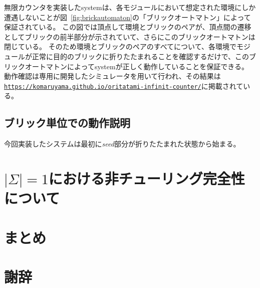 \documentclass[a4j,11pt]{article}
\begin{document}
無限カウンタを実装したsystemは、各モジュールにおいて想定された環境にしか遭遇しないことが図~\ref{fig:brickautomaton}の「ブリックオートマトン」によって保証されている。
この図では頂点して環境とブリックのペアが、頂点間の遷移としてブリックの前半部分が示されていて、さらにこのブリックオートマトンは閉じている。
そのため環境とブリックのペアのすべてについて、各環境でモジュールが正常に目的のブリックに折りたたまれることを確認するだけで、このブリックオートマトンによってsystemが正しく動作していることを保証できる。
動作確認は専用に開発したシミュレータを用いて行われ、その結果は\href{https://komaruyama.github.io/oritatami-infinit-counter/}{\texttt{https://komaruyama.github.io/oritatami-infinit-counter/}}に掲載されている。


\subsection{ブリック単位での動作説明}
今回実装したシステムは最初に\textit{seed}部分が折りたたまれた状態から始まる。


\section{$| \Sigma | = 1$における非チューリング完全性について}

\section{まとめ}

\section{謝辞}



\end{document}
